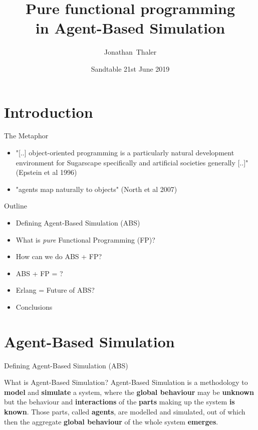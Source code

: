 \documentclass{beamer} %
\title[Pure functional programming in Agent-Based Simulation] 
{%
  Pure functional programming \\ in Agent-Based Simulation
}
\author[Thaler]
{
  Jonathan~Thaler
}
\institute[University of Nottingham, Nottingham, United Kingdom]
{
  University of Nottingham, Nottingham, United Kingdom
}
\date[Sandtable 21st June 2019]
{Sandtable 21st June 2019}
\begin{document}
\begin{frame}
  \titlepage
\end{frame}

\section{Introduction}
\begin{frame}{The Metaphor}
\begin{itemize}
  \item "[..] object-oriented programming is a particularly natural development environment for Sugarscape specifically and artificial societies generally [..]" (Epstein et al 1996)
  
  \item "agents map naturally to objects" (North et al 2007)
\end{itemize}
\end{frame}

\begin{frame}{Outline}
\begin{itemize}
  \item Defining Agent-Based Simulation (ABS)
  
  \item What is \textit{pure} Functional Programming (FP)?
  
  \item How can we do ABS + FP?  
  
  \item ABS + FP = ?
  
  \item Erlang = Future of ABS?
  
  \item Conclusions
\end{itemize}
\end{frame}

\section{Agent-Based Simulation}
\begin{frame}{Defining Agent-Based Simulation (ABS)}
  \begin{block}{What is Agent-Based Simulation?}
    Agent-Based Simulation is a methodology to \textbf{model} and \textbf{simulate} a system, where the \textbf{global behaviour} may be \textbf{unknown} but the behaviour and \textbf{interactions} of the \textbf{parts} making up the system \textbf{is known}. Those parts, called \textbf{agents}, are modelled and simulated, out of which then the aggregate \textbf{global behaviour} of the whole system \textbf{emerges}.
  \end{block}
\end{frame}
\end{document}
